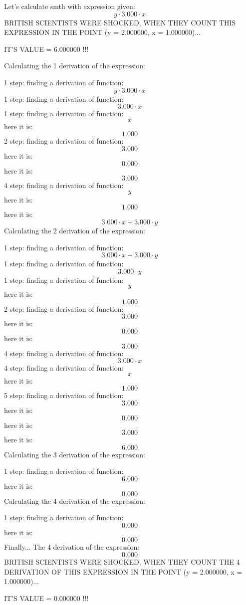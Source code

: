 \documentclass{article}
\begin{document}
Let's calculate smth with expression given:
\[{{y}\cdot{{3.000}\cdot{x}}}\]
BRITISH SCIENTISTS WERE SHOCKED, WHEN THEY COUNT THIS EXPRESSION IN THE POINT (y = 2.000000, x = 1.000000)...

IT'S VALUE = 6.000000 !!!


Calculating the 1 derivation of the expression:

1 step:
finding a derivation of function:
\[{{y}\cdot{{3.000}\cdot{x}}}\]
1 step:
finding a derivation of function:
\[{{3.000}\cdot{x}}\]
1 step:
finding a derivation of function:
\[{x}\]
here it is:
\[{1.000}\]
2 step:
finding a derivation of function:
\[{3.000}\]
here it is:
\[{0.000}\]
here it is:
\[{3.000}\]
4 step:
finding a derivation of function:
\[{y}\]
here it is:
\[{1.000}\]
here it is:
\[{{{3.000}\cdot{x}}+{{3.000}\cdot{y}}}\]
Calculating the 2 derivation of the expression:

1 step:
finding a derivation of function:
\[{{{3.000}\cdot{x}}+{{3.000}\cdot{y}}}\]
1 step:
finding a derivation of function:
\[{{3.000}\cdot{y}}\]
1 step:
finding a derivation of function:
\[{y}\]
here it is:
\[{1.000}\]
2 step:
finding a derivation of function:
\[{3.000}\]
here it is:
\[{0.000}\]
here it is:
\[{3.000}\]
4 step:
finding a derivation of function:
\[{{3.000}\cdot{x}}\]
4 step:
finding a derivation of function:
\[{x}\]
here it is:
\[{1.000}\]
5 step:
finding a derivation of function:
\[{3.000}\]
here it is:
\[{0.000}\]
here it is:
\[{3.000}\]
here it is:
\[{6.000}\]
Calculating the 3 derivation of the expression:

1 step:
finding a derivation of function:
\[{6.000}\]
here it is:
\[{0.000}\]
Calculating the 4 derivation of the expression:

1 step:
finding a derivation of function:
\[{0.000}\]
here it is:
\[{0.000}\]
Finally... The 4 derivation of the expression:
\[{0.000}\]
BRITISH SCIENTISTS WERE SHOCKED, WHEN THEY COUNT THE 4 DERIVATION OF THIS EXPRESSION IN THE POINT (y = 2.000000, x = 1.000000)...

IT'S VALUE = 0.000000 !!!
\end{document}
